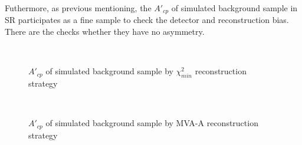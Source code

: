 		Futhermore, as previous mentioning, the $A'_{cp}$ of simulated background sample in SR participates as a fine sample to check the detector and reconstruction bias. There are the checks whether they have no asymmetry.

		\begin{figure}[H]
			\centering
				\\
		\caption{$A'_{cp}$ of simulated background sample by $\chi^2_{min}$ reconstruction strategy}
		\label{AsymBias:fig:chi2_sim_bkg_A'cp}
		\end{figure}
		\FloatBarrier

		\begin{figure}[H]
			\centering
				\\
		\caption{$A'_{cp}$ of simulated background sample by MVA-A reconstruction strategy}
		\label{AsymBias:fig:a05_Mlbcut_sim_bkg_A'cp}
		\end{figure}
		\FloatBarrier


